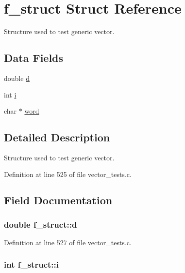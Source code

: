\hypertarget{structf__struct}{
\section{f\_\-struct Struct Reference}
\label{structf__struct}
}


Structure used to test generic vector.  


\subsection*{Data Fields}
\begin{DoxyCompactItemize}
\item 
double \hyperlink{structf__struct_aabfd173ef817f4c258a9e55aaa2ec9cf}{d}
\item 
int \hyperlink{structf__struct_a87df300d9aa87b7df7cba13e548c948f}{i}
\item 
char $\ast$ \hyperlink{structf__struct_aa8f65f08c5e6180da916f9001438eab5}{word}
\end{DoxyCompactItemize}


\subsection{Detailed Description}
Structure used to test generic vector. 

Definition at line 525 of file vector\_\-tests.c.



\subsection{Field Documentation}
\hypertarget{structf__struct_aabfd173ef817f4c258a9e55aaa2ec9cf}{
\subsubsection[{d}]{\setlength{\rightskip}{0pt plus 5cm}double {\bf f\_\-struct::d}}}
\label{structf__struct_aabfd173ef817f4c258a9e55aaa2ec9cf}


Definition at line 527 of file vector\_\-tests.c.

\hypertarget{structf__struct_a87df300d9aa87b7df7cba13e548c948f}{
\subsubsection[{i}]{\setlength{\rightskip}{0pt plus 5cm}int {\bf f\_\-struct::i}}}
\label{structf__struct_a87df300d9aa87b7df7cba13e548c948f}


